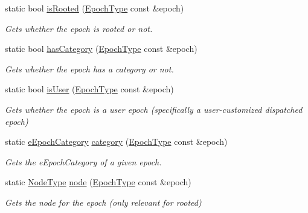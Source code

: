 \begin{DoxyCompactItemize}
\item 
static bool \hyperlink{structvt_1_1epoch_1_1_epoch_manip_a00210a34334fb86984cfbd08bae74929}{is\+Rooted} (\hyperlink{namespacevt_a985a5adf291c34a3ca263b3378388236}{Epoch\+Type} const \&epoch)
\begin{DoxyCompactList}\small\item\em Gets whether the epoch is rooted or not. \end{DoxyCompactList}\item 
static bool \hyperlink{structvt_1_1epoch_1_1_epoch_manip_a57a6313d8f4ffc685ee47b2a881079ac}{has\+Category} (\hyperlink{namespacevt_a985a5adf291c34a3ca263b3378388236}{Epoch\+Type} const \&epoch)
\begin{DoxyCompactList}\small\item\em Gets whether the epoch has a category or not. \end{DoxyCompactList}\item 
static bool \hyperlink{structvt_1_1epoch_1_1_epoch_manip_afb2b55c1d422512bc266f04e1aff7904}{is\+User} (\hyperlink{namespacevt_a985a5adf291c34a3ca263b3378388236}{Epoch\+Type} const \&epoch)
\begin{DoxyCompactList}\small\item\em Gets whether the epoch is a user epoch (specifically a user-\/customized dispatched epoch) \end{DoxyCompactList}\item 
static \hyperlink{namespacevt_1_1epoch_a956abe0aceef0d10a988de8acb002c7c}{e\+Epoch\+Category} \hyperlink{structvt_1_1epoch_1_1_epoch_manip_aa61d47033545df147c01036211c4cabe}{category} (\hyperlink{namespacevt_a985a5adf291c34a3ca263b3378388236}{Epoch\+Type} const \&epoch)
\begin{DoxyCompactList}\small\item\em Gets the {\ttfamily e\+Epoch\+Category} of a given epoch. \end{DoxyCompactList}\item 
static \hyperlink{namespacevt_a866da9d0efc19c0a1ce79e9e492f47e2}{Node\+Type} \hyperlink{structvt_1_1epoch_1_1_epoch_manip_a7120f73ef583ab8f061334fc0bc519c3}{node} (\hyperlink{namespacevt_a985a5adf291c34a3ca263b3378388236}{Epoch\+Type} const \&epoch)
\begin{DoxyCompactList}\small\item\em Gets the node for the epoch (only relevant for rooted) \end{DoxyCompactList}\item 

\end{DoxyCompactItemize}
